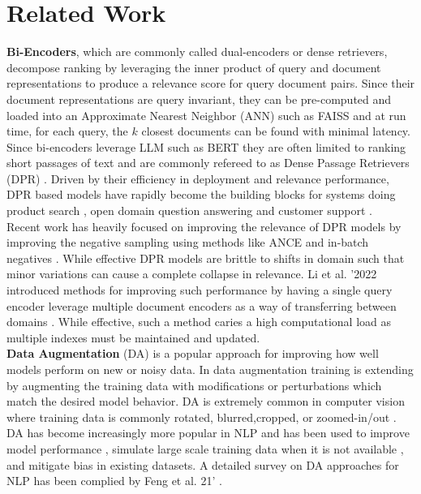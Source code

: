 \section{Related Work}
\label{sec:rel}
\textbf{Bi-Encoders}, which are commonly called dual-encoders or dense retrievers, decompose ranking by leveraging the inner product of query and document representations to produce a relevance score for query document pairs. Since their document representations are query invariant, they can be pre-computed and loaded into an Approximate Nearest Neighbor (ANN) such as FAISS \cite{johnson2019billion} and at run time, for each query, the $k$ closest documents can be found with minimal latency. Since bi-encoders leverage LLM such as BERT \cite{Devlin2019BERTPO} they are often limited to ranking short passages of text and are commonly refereed to as Dense Passage Retrievers (DPR) \cite{Karpukhin2020DensePR}. Driven by their efficiency in deployment and relevance performance, DPR based models have rapidly become the building blocks for systems doing product search \cite{Magnani2022SemanticRA}, open domain question answering \cite{Karpukhin2020DensePR} and customer support \cite{Mesquita2022DenseTR}.\\
Recent work has heavily focused on improving the relevance of DPR models by improving the negative sampling using methods like ANCE \cite{Xiong2021ApproximateNN} and in-batch negatives \cite{Lin2021InBatchNF}. While effective DPR models are brittle to shifts in domain such that minor variations can cause a complete collapse in relevance. Li et al. '2022 introduced methods for improving such performance by having a single query encoder leverage multiple document encoders as a way of transferring between domains \cite{Li2022AnEA}. While effective, such a method caries a high computational load as multiple indexes must be maintained and updated. \\
\textbf{Data Augmentation} (DA) is a popular approach for improving how well models perform on new or noisy data. In data augmentation training is extending by augmenting the training data with modifications or perturbations which match the desired model behavior. DA is extremely common in computer vision where training data is commonly rotated, blurred,cropped, or zoomed-in/out \cite{Mikoajczyk2018DataAF} \cite{Zhong2020RandomED}. DA has become increasingly more popular in NLP and has been used to improve model performance \cite{Jiao2020TinyBERTDB}, simulate large scale training data when it is not available \cite{Li2020ADD}, and mitigate bias \cite{Lu2020GenderBI} in existing datasets. A detailed survey on DA approaches for NLP has been complied by Feng et al. 21' \cite{Feng2021ASO}.\\

